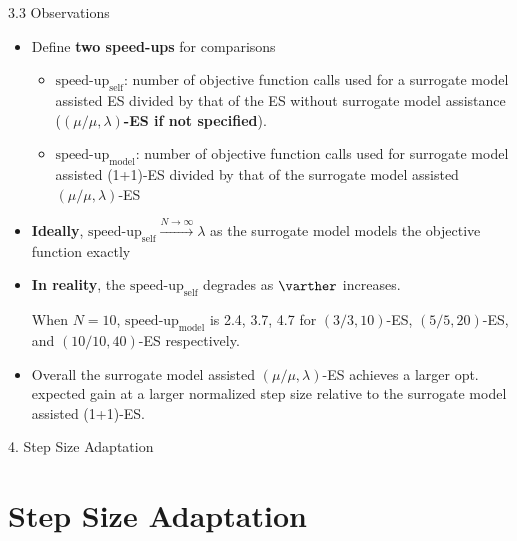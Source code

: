 \documentclass{beamer}
\begin{document}
\begin{frame}{3.3 Observations}
\begin{itemize}
    \item Define \textbf{two speed-ups} for comparisons 
    \begin{itemize}
        \item $\text{speed-up}_{\text{self}}$: number of objective function calls used for a surrogate model assisted ES divided by that of the ES without surrogate model assistance (\textbf{$(\mu/\mu,\lambda)$-ES if not specified}). 
        \item $\text{speed-up}_{\text{model}}$: number of objective function calls used for surrogate model assisted (1+1)-ES divided by that of the surrogate model assisted $(\mu/\mu,\lambda)$-ES
    \end{itemize}     
    \item \textbf{Ideally}, $\text{speed-up}_{\text{self}} \overset{N\rightarrow\infty}{\rightarrow} \lambda$ as the surrogate model models the objective function exactly
    \item \textbf{In reality}, the  $\text{speed-up}_{\text{self}}$ degrades as $\varther$ increases. 
    
    When $N=10$, $\text{speed-up}_{\text{model}}$ is 2.4, 3.7, 4.7 for $(3/3,10)$-ES, $(5/5,20)$-ES, and $(10/10,40)$-ES respectively. 
    \item Overall the surrogate model assisted $(\mu/\mu,\lambda)$-ES achieves a larger opt. expected gain at a larger normalized step size relative to the surrogate model assisted (1+1)-ES. 
\end{itemize}
\end{frame}

\begin{frame}[plain,c]
\begin{center}
\Huge 4. Step Size Adaptation
\end{center}
\end{frame}
\section{Step Size Adaptation}
\end{document}
